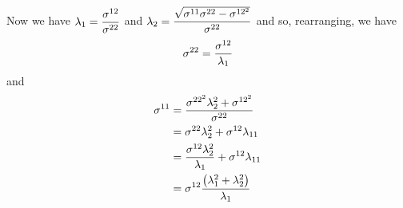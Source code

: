Now we have $\lambda_{1}=\dfrac{ \sigma ^{12}}{ \sigma ^{22}}$ and
$\lambda_{2}=\dfrac{\sqrt{ \sigma ^{11} \sigma ^{22}- \sigma ^{{12}^{2}}}}{ \sigma ^{22}}$
and so, rearranging, we have
\begin{equation}
   \sigma ^{22}=\dfrac{ \sigma ^{12}}{\lambda_{1}}
\end{equation}
and
\begin{equation}
  \begin{aligned}
     \sigma ^{11}&=\dfrac{ \sigma ^{{22}^{2}}\lambda_{2}^{2}+
       \sigma ^{{12}^{2}}}{ \sigma ^{22}}\\
    &= \sigma ^{22}\lambda_{2}^{2}+ \sigma ^{12}\lambda_{11}\\
    &=\dfrac{ \sigma ^{12}\lambda_{2}^{2}}{\lambda_{1}}+ \sigma ^{12}\lambda_{11}\\
    &= \sigma ^{12}\dfrac{\left( \lambda_{1}^{2}+\lambda_{2}^{2} \right)}{\lambda_{1}}
  \end{aligned}
\end{equation}

